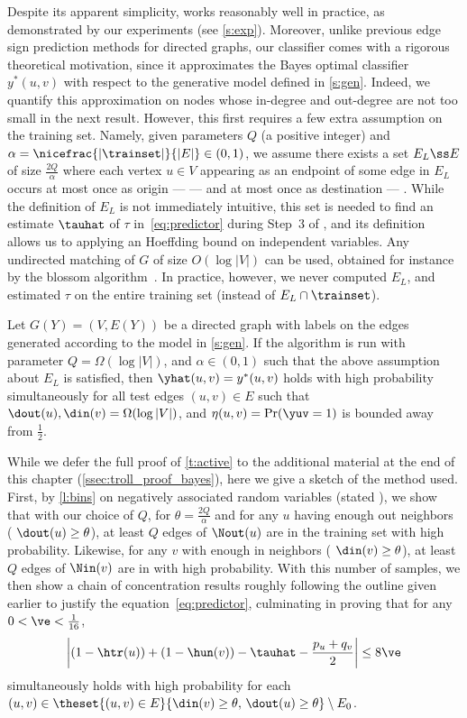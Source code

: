 Despite its apparent simplicity, \usrule{}
works reasonably well in practice, as demonstrated by our experiments (see \autoref{s:exp}).
Moreover, unlike previous edge sign prediction methods for directed graphs, our classifier comes
with a rigorous theoretical motivation, since it approximates the Bayes optimal classifier
$y^*(u,v)$ with respect to the generative model defined in \autoref{s:gen}. Indeed, we quantify this
approximation on nodes whose in-degree and out-degree are not too small in the next result. However,
this first requires a few extra assumption on the training set. Namely, given parameters $Q$ (a
positive integer) and $\alpha = \nicefrac{|\trainset|}{|E|} \in (0,1)$, we assume there exists a set
$E_L \ss E$ of size $\tfrac{2Q}{\alpha}$ where each vertex $u \in V$ appearing as an endpoint of
some edge in $E_L$ occurs at most once as origin ---\ie{} \euv{}--- and at most once as destination
---\ie{} \evu{}. While the definition of $E_L$ is not immediately intuitive, this set is needed to
find an estimate $\tauhat$ of $\tau$ in~\eqref{eq:predictor} during Step~3 of \usrule{}, and its
definition allows us to applying an Hoeffding bound on independent variables. Any undirected
matching of $G$ of size $O(\log|V|)$ can be used, obtained for instance by the blossom
algorithm~\autocite{matching65}. In practice, however, we never computed $E_L$, and estimated $\tau$
on the entire training set \trainset{} (instead of $E_L \cap \trainset$).

\begin{theorem}
  \label{t:active}
  Let $G(Y) = (V,E(Y))$ be a directed graph with labels on the edges generated according to the
  model in \autoref{s:gen}.
  If the algorithm is run with parameter $Q = \Omega(\log|V|)$, and $\alpha \in (0,1)$ such that the
  above assumption about $E_L$ is satisfied, then $\yhat(u,v) = y^*(u,v)$ holds with high probability
  simultaneously for all test edges $(u,v) \in E$ such that $\dout(u),\din(v) = \Omega(\log|V|)$, and
  $\eta(u,v) = \Pr(\yuv=1)$ is bounded away from $\tfrac{1}{2}$.
\end{theorem}

While we defer the full proof of \autoref{t:active} to the additional material at the end of this
chapter (\autoref{ssec:troll_proof_bayes}), here we give a sketch of the method used.
First, by \autoref{l:bins} on negatively associated random variables (stated
), we show that with our choice of $Q$, for $\theta=\frac{2Q}{\alpha}$ and for any
$u$ having enough out neighbors (\ie{} $\dout(u) \ge \theta$), at least $Q$ edges of $\Nout(u)$
are in the training set with high probability. Likewise, for any $v$ with enough in neighbors (\ie
$\din(v) \ge \theta$), at least $Q$ edges of $\Nin(v)$ are in \trainset with high probability.
With this number of samples, we then show a chain of concentration results roughly following the
outline given earlier to justify the equation~\eqref{eq:predictor}, culminating in proving that 
for any $0 < \ve < \tfrac{1}{16}$,
\[ \left| \left( 1 - \htr(u) \right) + \left( 1 - \hun(v) \right) - \tauhat
  - \frac{p_u+q_v}{2} \right| \le 8\ve \]
simultaneously holds with high probability for each $(u,v) \in \theset{(u,v) \in E}{\din(v) \ge
  \theta,\, \dout(u) \ge \theta} \setminus E_0$.

